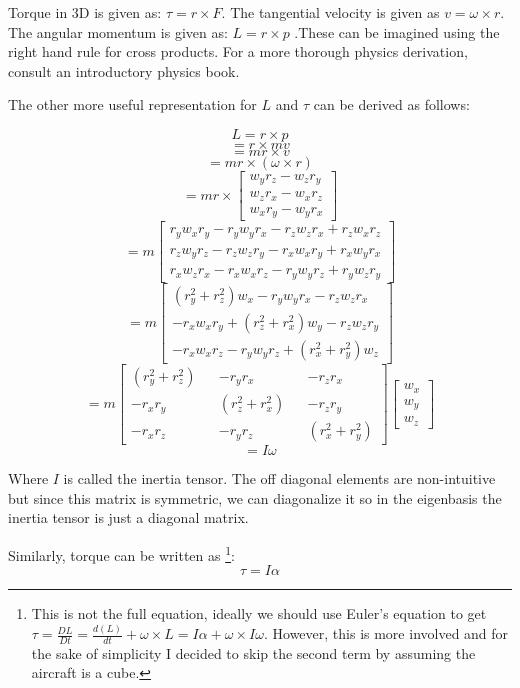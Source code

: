 Torque in 3D is given as: $\tau = r \times F$. The tangential velocity is given as $v = \omega \times r$. The angular momentum is given as: $L = r \times p$ .These can be imagined using the right hand rule for cross products. For a more thorough physics derivation, consult an introductory physics book.

The other more useful representation for $L$ and $\tau$ can be derived as follows:

\[
L = r \times p
\]
\[ 
= r \times mv
\]
\[ 
= mr \times v
\]
\[ 
= mr \times (\omega \times r)
\]
\[ 
= mr \times 
\begin{bmatrix}
    w_yr_z - w_zr_y \\
    w_zr_x - w_xr_z \\
    w_xr_y - w_yr_x  
\end{bmatrix}
\]
\[
= m
\begin{bmatrix}
    r_yw_xr_y - r_yw_yr_x - r_zw_zr_x + r_zw_xr_z \\
    r_zw_yr_z - r_zw_zr_y - r_xw_xr_y + r_xw_yr_x \\
    r_xw_zr_x - r_xw_xr_z - r_yw_yr_z + r_yw_zr_y
\end{bmatrix}
\]
\[
= m
\begin{bmatrix}
    (r_y^2 + r_z^2)w_x - r_yw_yr_x - r_zw_zr_x\\
    -r_xw_xr_y + (r_z^2 + r_x^2)w_y - r_zw_zr_y \\
    -r_xw_xr_z - r_yw_yr_z + (r_x^2 + r_y^2)w_z
\end{bmatrix}
\]
\[
= m
\begin{bmatrix}
    (r_y^2 + r_z^2) && -r_yr_x && -r_zr_x\\
    -r_xr_y && (r_z^2 + r_x^2) && -r_zr_y \\
    -r_xr_z && -r_yr_z && (r_x^2 + r_y^2)
\end{bmatrix}
\begin{bmatrix}
    w_x\\
    w_y\\
    w_z
\end{bmatrix}
\]
\[
= I\omega
\]

Where $I$ is called the inertia tensor. The off diagonal elements are non-intuitive but since this matrix is symmetric, we can diagonalize it so in the eigenbasis the inertia tensor is just a diagonal matrix.

Similarly, torque can be written as \footnote{This is not the full equation, ideally we should use Euler's equation to get  $\tau = \frac{DL}{Dt} = \frac{d(L)}{dt} + \omega \times L = I\alpha + \omega \times I \omega$. However, this is more involved and for the sake of simplicity I decided to skip the second term by assuming the aircraft is a cube.}:
\[ 
\tau = I\alpha
\]

